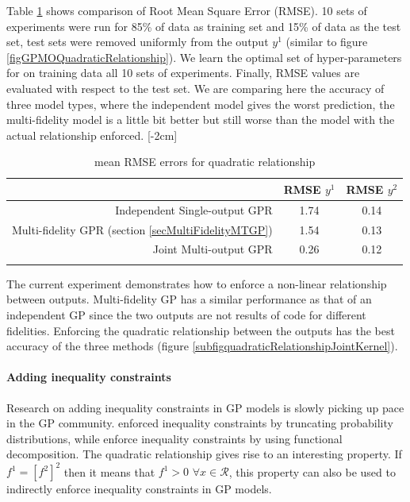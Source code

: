 Table \ref{table:rmseY1Y2} shows comparison of Root Mean Square Error (RMSE). 10 sets of experiments were run for 85\% of data as training set and 15\% of data as the test set, test sets were removed uniformly from the output $y^1$ (similar to figure \ref{figGPMOQuadraticRelationship}). We learn the optimal set of hyper-parameters for on training data all 10 sets of experiments. Finally, RMSE values are evaluated with respect to the test set. We are comparing here the accuracy of three model types, where the independent model gives the worst prediction, the multi-fidelity model is a little bit better but still worse than the model with the actual relationship enforced. 
[-2cm]

\begin{table}
\caption{mean RMSE errors for quadratic relationship}
\centering
\label{t:observed_psrs}
\begin{tabular}{rcc}
\noalign{\smallskip} \hline \hline \noalign{\smallskip}
 & RMSE \(y^{1}\) & RMSE \(y^{2}\) \\
\hline
Independent Single-output GPR & 1.74 & 0.14 \\
Multi-fidelity GPR (section \ref{secMultiFidelityMTGP})& 1.54 & 0.13 \\
Joint Multi-output GPR & 0.26 & 0.12 \\
\noalign{\smallskip} \hline \noalign{\smallskip}
\end{tabular}
\label{table:rmseY1Y2}
\end{table}

The current experiment demonstrates how to enforce a non-linear relationship between outputs. Multi-fidelity GP has a similar performance as that of an independent GP since the two outputs are not results of code for different fidelities. Enforcing the quadratic relationship between the outputs has the best accuracy of the three methods (figure \ref{subfigquadraticRelationshipJointKernel}). 

\paragraph{Adding inequality constraints}
Research on adding inequality constraints in GP models is slowly picking up pace in the GP community. \cite{da2012gaussian} enforced inequality constraints by truncating probability distributions, while \cite{maatouk2017gaussian} enforce inequality constraints by using functional decomposition. The quadratic relationship gives rise to an interesting property. If  $f^{1} = \left [f^{2} \right]^2$ then it means that $f^{1} > 0$ $\forall x \in \mathcal{R}$, this property can also be used to indirectly enforce inequality constraints in GP models. 


